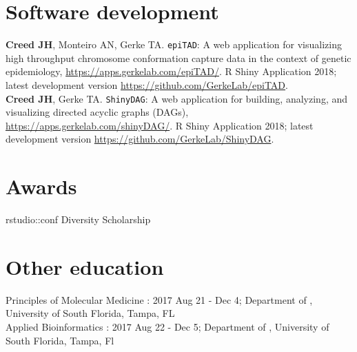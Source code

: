 \documentclass[11pt, a4paper]{article} %
\newcommand{\years}[1]{\marginnote{\scriptsize \raise .3ex\hbox{#1}}} %
\begin{document}


\section*{Software development}

{\bf Creed JH}, Monteiro AN, Gerke TA. \verb|epiTAD|: A web application for visualizing high throughput chromosome conformation capture data in the context of genetic epidemiology, \href{https://apps.gerkelab.com/epiTAD/}{https://apps.gerkelab.com/epiTAD/}. R Shiny Application 2018; latest development version \href{https://github.com/GerkeLab/epiTAD}{https://github.com/GerkeLab/epiTAD}.\\

{\bf Creed JH}, Gerke TA. \verb|ShinyDAG|: A web application for building, analyzing, and visualizing directed acyclic graphs (DAGs), \href{https://apps.gerkelab.com/shinyDAG/}{https://apps.gerkelab.com/shinyDAG/}. R Shiny Application 2018; latest development version \href{https://github.com/GerkeLab/ShinyDAG}{https://github.com/GerkeLab/ShinyDAG}.

\section*{Awards}

\years{2018} rstudio::conf Diversity Scholarship


\section*{Other education}

Principles of Molecular Medicine : 2017 Aug 21 - Dec 4; Department of , University of South Florida, Tampa, FL\\

Applied Bioinformatics : 2017 Aug 22 - Dec 5; Department of , University of South Florida, Tampa, Fl \\
\end{document}
